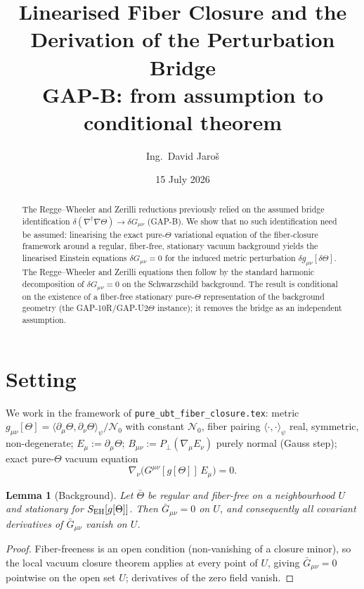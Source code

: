 \documentclass[11pt,a4paper]{article}
\title{Linearised Fiber Closure and the Derivation of the Perturbation Bridge\\
\large GAP-B: from assumption to conditional theorem}
\author{Ing.\ David Jaroš}
\date{15 July 2026}
\newtheorem{lemma}{Lemma}
\newcommand{\Nzero}{\mathcal N_0}
\newcommand{\avg}[1]{\langle #1\rangle_\psi}
\begin{document}
\maketitle

\begin{abstract}
The Regge--Wheeler and Zerilli reductions previously relied on the assumed
bridge identification $\delta(\nabla^\dagger\nabla\Theta)\to\delta G_{\mu\nu}$
(GAP-B). We show that no such identification need be assumed: linearising the
exact pure-$\Theta$ variational equation of the fiber-closure framework around
a regular, fiber-free, stationary vacuum background yields the linearised
Einstein equations $\delta G_{\mu\nu}=0$ for the induced metric perturbation
$\delta g_{\mu\nu}[\delta\Theta]$. The Regge--Wheeler and Zerilli equations then
follow by the standard harmonic decomposition of $\delta G_{\mu\nu}=0$ on the
Schwarzschild background. The result is conditional on the existence of a
fiber-free stationary pure-$\Theta$ representation of the background geometry
(the GAP-10R/GAP-U2$\Theta$ instance); it removes the bridge as an independent
assumption.
\end{abstract}

\section{Setting}
We work in the framework of \texttt{pure\_ubt\_fiber\_closure.tex}: metric
$g_{\mu\nu}[\Theta]=\avg{\partial_\mu\Theta,\partial_\nu\Theta}/\Nzero$ with
constant $\Nzero$, fiber pairing $\avg{\cdot,\cdot}$ real, symmetric,
non-degenerate; $E_\mu:=\partial_\mu\Theta$;
$B_{\mu\nu}:=P_\perp(\nabla_\mu E_\nu)$ purely normal (Gauss step); exact
pure-$\Theta$ vacuum equation
\begin{equation}
  \nabla_\nu\bigl(G^{\mu\nu}[g[\Theta]]\,E_\mu\bigr)=0.
  \label{eq:exactvac}
\end{equation}

\begin{lemma}[Background]
Let $\bar\Theta$ be regular and fiber-free on a neighbourhood $U$ and
stationary for $S_{\rm EH}[g[\Theta]]$. Then $\bar G_{\mu\nu}=0$ on $U$, and
consequently all covariant derivatives of $\bar G_{\mu\nu}$ vanish on $U$.
\end{lemma}
\begin{proof}
Fiber-freeness is an open condition (non-vanishing of a closure minor), so the
local vacuum closure theorem applies at every point of $U$, giving
$\bar G_{\mu\nu}=0$ pointwise on the open set $U$; derivatives of the zero
field vanish.
\end{proof}
\end{document}
